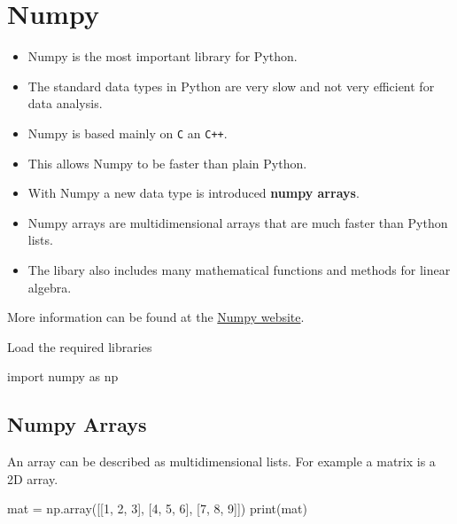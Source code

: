 \documentclass[
  letterpaper,
  DIV=11,
  numbers=noendperiod]{scrreprt}
\newenvironment{Shaded}{\begin{snugshade}}{\end{snugshade}}
\newcommand{\BuiltInTok}[1]{\textcolor[rgb]{0.00,0.23,0.31}{#1}}
\newcommand{\DecValTok}[1]{\textcolor[rgb]{0.68,0.00,0.00}{#1}}
\newcommand{\ImportTok}[1]{\textcolor[rgb]{0.00,0.46,0.62}{#1}}
\newcommand{\NormalTok}[1]{\textcolor[rgb]{0.00,0.23,0.31}{#1}}
\newcommand{\OperatorTok}[1]{\textcolor[rgb]{0.37,0.37,0.37}{#1}}
\providecommand{\tightlist}{%
  \setlength{\itemsep}{0pt}\setlength{\parskip}{0pt}}\usepackage{longtable,booktabs,array}
\begin{document}

\section*{Numpy}\label{numpy}


\begin{itemize}
\tightlist
\item
  Numpy is the most important library for Python.
\item
  The standard data types in Python are very slow and not very efficient
  for data analysis.
\item
  Numpy is based mainly on \texttt{C} an \texttt{C++}.
\item
  This allows Numpy to be faster than plain Python.
\item
  With Numpy a new data type is introduced \textbf{numpy arrays}.
\item
  Numpy arrays are multidimensional arrays that are much faster than
  Python lists.
\item
  The libary also includes many mathematical functions and methods for
  linear algebra.
\end{itemize}

More information can be found at the \href{https://numpy.org/}{Numpy
website}.

Load the required libraries

\begin{Shaded}
\begin{Highlighting}[]
\ImportTok{import}\NormalTok{ numpy }\ImportTok{as}\NormalTok{ np}
\end{Highlighting}
\end{Shaded}

\subsection*{Numpy Arrays}\label{numpy-arrays}

An array can be described as multidimensional lists. For example a
matrix is a 2D array.

\begin{Shaded}
\begin{Highlighting}[]
\NormalTok{mat }\OperatorTok{=}\NormalTok{ np.array([[}\DecValTok{1}\NormalTok{, }\DecValTok{2}\NormalTok{, }\DecValTok{3}\NormalTok{], [}\DecValTok{4}\NormalTok{, }\DecValTok{5}\NormalTok{, }\DecValTok{6}\NormalTok{], [}\DecValTok{7}\NormalTok{, }\DecValTok{8}\NormalTok{, }\DecValTok{9}\NormalTok{]])}
\BuiltInTok{print}\NormalTok{(mat)}
\end{Highlighting}
\end{Shaded}
\end{document}
